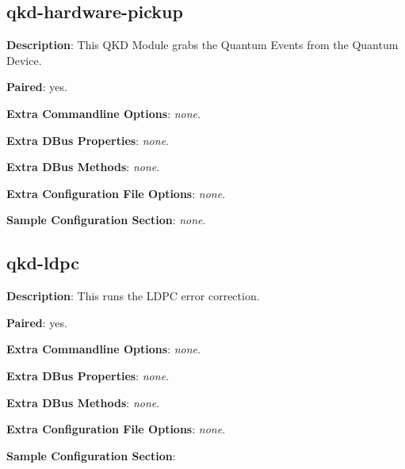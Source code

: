 \clearpage


\subsection{qkd-hardware-pickup}
\label{subsec:qkd-hardware-pickup}

\textbf{Description}: This QKD Module grabs the Quantum Events from the Quantum Device.

\bigskip

\noindent \textbf{Paired}: yes.

\bigskip

\noindent \textbf{Extra Commandline Options}: \emph{none}.

\bigskip

\noindent \textbf{Extra DBus Properties}: \emph{none}.

\bigskip

\noindent \textbf{Extra DBus Methods}: \emph{none}.

\bigskip

\noindent \textbf{Extra Configuration File Options}: \emph{none}.

\bigskip

\noindent \textbf{Sample Configuration Section}:  \emph{none}. 

\clearpage


\subsection{qkd-ldpc}
\label{subsec:qkd-ldpc}

\textbf{Description}: This runs the LDPC error correction.

\bigskip

\noindent \textbf{Paired}: yes.

\bigskip

\noindent \textbf{Extra Commandline Options}: \emph{none}.

\bigskip

\noindent \textbf{Extra DBus Properties}: \emph{none}.

\bigskip

\noindent \textbf{Extra DBus Methods}: \emph{none}.

\bigskip

\noindent \textbf{Extra Configuration File Options}: \emph{none}.

\bigskip

\noindent \textbf{Sample Configuration Section}: 

\medskip


